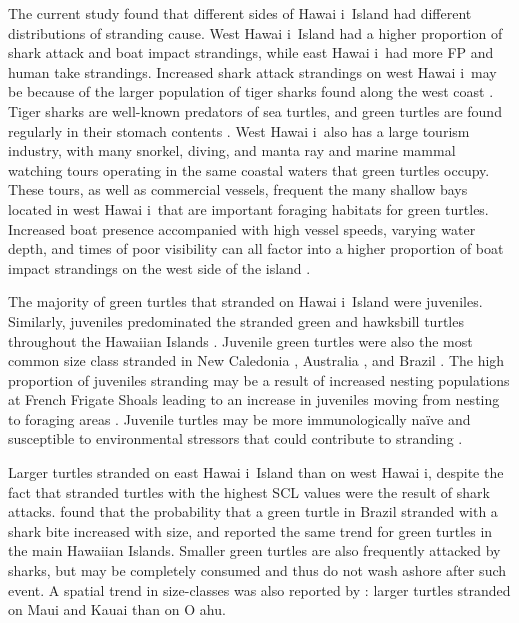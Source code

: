 \documentclass[sn-basic,NameDate]{sn-jnl}\usepackage[]{graphicx}\usepackage[]{xcolor}
\DeclareRobustCommand{\okina}{%
  \raisebox{\dimexpr\fontcharht\font`A-\height}{%
    \scalebox{0.8}{`}%
  }%
}
\newcommand{\Hawaii}{Hawai\okina i}
\newcommand{\Oahu}{O\okina ahu}
\begin{document}
The current study found that different sides of \Hawaii\ Island had different distributions of stranding cause. West \Hawaii\ Island had a higher proportion of shark attack and boat impact strandings, while east \Hawaii\ had more FP and human take strandings.
Increased shark attack strandings on west \Hawaii\ may be because of the larger population of tiger sharks found along the west coast \citep{meyer2009long}. 
Tiger sharks are well-known predators of sea turtles, and green turtles are found regularly in their stomach contents \citep{witzell1987selective, lowe1996ontogenetic}. 
West \Hawaii\ also has a large tourism industry, with many snorkel, diving, and manta ray and marine mammal watching tours operating in the same coastal waters that green turtles occupy. 
These tours, as well as commercial vessels, frequent the many shallow bays located in west \Hawaii\ that are important foraging habitats for green turtles. 
Increased boat presence accompanied with high vessel speeds, varying water depth, and times of poor visibility can all factor into a higher proportion of boat impact strandings on the west side of the island \citep{fuentes2021conservation}.

The majority of green turtles that stranded on \Hawaii\ Island were juveniles. Similarly, juveniles predominated the stranded green and hawksbill turtles throughout the Hawaiian Islands \citep{chaloupka2008cause, brunson2022three}.
Juvenile green turtles were also the most common size class stranded in New Caledonia \citep{read2023twenty}, Australia \citep{flint2015trends}, and Brazil \citep{monteiro2016long}. 
The high proportion of juveniles stranding may be a result of increased nesting populations at French Frigate Shoals leading to an increase in juveniles moving from nesting to foraging areas \citep{balazs2004thirty}.
Juvenile turtles may be more immunologically na\"{i}ve and susceptible to environmental stressors that could contribute to stranding \citep{flint2015trends}. 

Larger turtles stranded on east \Hawaii\ Island than on west \Hawaii, despite the fact that stranded turtles with the highest SCL values were the result of shark attacks.
\cite{bornatowski2012shark} found that the probability that a green turtle in Brazil stranded with a shark bite increased with size, and \cite{chaloupka2008cause} reported the same trend for green turtles in the main Hawaiian Islands.
Smaller green turtles are also frequently attacked by sharks, but may be completely consumed and thus do not wash ashore after such event.
A spatial trend in size-classes was also reported by \cite{chaloupka2008cause}: larger turtles stranded on Maui and Kauai than on \Oahu.
\end{document}
